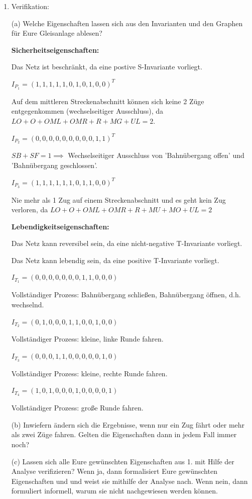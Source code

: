 \documentclass{scrreprt}
\begin{document}
\begin{enumerate}
\newpage

\item Verifikation:

(a) Welche Eigenschaften lassen sich aus den Invarianten und den Graphen für Eure Gleisanlage ablesen?

\textbf{Sicherheitseigenschaften:}


Das Netz ist beschränkt, da eine postive S-Invariante vorliegt.

$I_{P_1} = (1, 1, 1, 1, 1, 0, 1, 0, 1, 0, 0)^T$

Auf dem mittleren Streckenabschnitt können sich keine 2 Züge entgegenkommen (wechselseitiger Ausschluss), da $LO + O + OML + OMR + R + MG + UL = 2$. 

$I_{P_2} = (0, 0, 0, 0, 0, 0, 0, 0, 0, 1, 1)^T$

$SB + SF = 1 \implies$ Wechselseitiger Ausschluss von 'Bahnübergang offen' und 'Bahnübergang geschlossen'.

$I_{P_3} = (1, 1, 1, 1, 1, 1, 0, 1, 1, 0, 0)^T$

Nie mehr als 1 Zug auf einem Streckenabschnitt und es geht kein Zug verloren, da $LO + O + OML + OMR + R + MU + MO + UL = 2$

\textbf{Lebendigkeitseigenschaften:}

Das Netz kann reversibel sein, da eine nicht-negative T-Invariante vorliegt.

Das Netz kann lebendig sein, da eine positive T-Invariante vorliegt.


$I_{T_1} = (0, 0, 0, 0, 0, 0, 0, 1, 1, 0, 0, 0)$

Vollständiger Prozess: Bahnübergang schließen, Bahnübergang öffnen, d.h. wechselnd.

$I_{T_2} = (0, 1, 0, 0, 0, 1, 1, 0, 0, 1, 0, 0)$

Vollständiger Prozess: kleine, linke Runde fahren.

$I_{T_3} = (0, 0, 0, 1, 1, 0, 0, 0, 0, 0, 1, 0)$

Vollständiger Prozess: kleine, rechte Runde fahren.

$I_{T_4} = (1, 0, 1, 0, 0, 0, 1, 0, 0, 0, 0, 1)$

Vollständiger Prozess: große Runde fahren.

(b) Inwiefern ändern sich die Ergebnisse, wenn nur ein Zug fährt oder mehr als zwei Züge fahren. Gelten die Eigenschaften dann in jedem Fall immer noch?


(c) Lassen sich alle Eure gewünschten Eigenschaften aus 1. mit Hilfe der Analyse verifizieren? Wenn ja, dann formalisiert Eure gewünschten Eigenschaften und
    und weist sie mithilfe der Analyse nach. Wenn nein, dann formuliert informell, warum sie nicht nachgewiesen werden können.


\end{enumerate}
\end{document}
